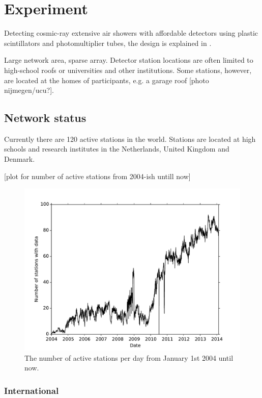 \chapter{\hisparc Experiment}
\label{ch:hisparc-experiment}

Detecting cosmic-ray extensive air showers with affordable detectors
using plastic scintillators and photomultiplier tubes, the design is
explained in .

Large network area, sparse array. Detector station locations are often
limited to high-school roofs or universities and other institutions.
Some stations, however, are located at the homes of participants, e.g.
a garage roof [photo nijmegen/ucu?].


\section{Network status}

Currently there are 120 active \hisparc stations in the world. Stations
are located at high schools and research institutes in the Netherlands,
United Kingdom and Denmark.

[plot for number of active stations from 2004-ish untill now]


\begin{figure}
    \centering
    \includegraphics[width=0.7\linewidth]{plots/network/number_of_stations_with_data_per_day}
    \caption{ The number of active
             stations per day from January 1st 2004 until now.}
    \label{fig:number_of_stations_with_data_per_day}
\end{figure}


\subsection{International}

